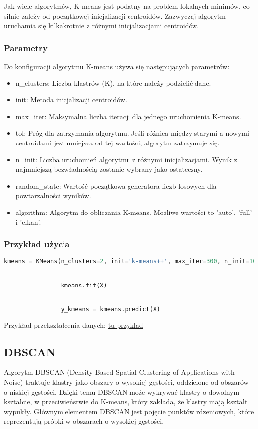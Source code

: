 			Jak wiele algorytmów, K-means jest podatny na problem lokalnych minimów, co silnie zależy od początkowej inicjalizacji centroidów. Zazwyczaj algorytm uruchamia się kilkakrotnie z różnymi inicjalizacjami centroidów.


			
		\subsubsection{Parametry}
			Do konfiguracji algorytmu K-means używa się następujących parametrów:
			\begin{itemize}
				\item n\_clusters: Liczba klastrów (K), na które należy podzielić dane.
				\item init: Metoda inicjalizacji centroidów.
				\item max\_iter: Maksymalna liczba iteracji dla jednego uruchomienia K-means.
				\item tol: Próg dla zatrzymania algorytmu. Jeśli różnica między starymi a nowymi centroidami jest mniejsza od tej wartości, algorytm zatrzymuje się.
				\item n\_init: Liczba uruchomień algorytmu z różnymi inicjalizacjami. Wynik z najmniejszą bezwładnością zostanie wybrany jako ostateczny.
				\item random\_state: Wartość początkowa generatora liczb losowych dla powtarzalności wyników.
				\item algorithm: Algorytm do obliczania K-means. Możliwe wartości to 'auto', 'full' i 'elkan'.
			\end{itemize}
			
		\subsubsection{Przykład użycia}
			\begin{lstlisting}[language=Python]
				kmeans = KMeans(n_clusters=2, init='k-means++', max_iter=300, n_init=10, random_state=0)


				kmeans.fit(X)


				y_kmeans = kmeans.predict(X)
			\end{lstlisting}
			
			
			Przykład przekształcenia danych:
			\underline{tu przyklad}

	  
	\subsection{DBSCAN}
		Algorytm DBSCAN (Density-Based Spatial Clustering of Applications with Noise) traktuje klastry jako obszary o wysokiej gęstości, oddzielone od obszarów o niskiej gęstości. Dzięki temu DBSCAN może wykrywać klastry o dowolnym kształcie, w przeciwieństwie do K-means, który zakłada, że klastry mają kształt wypukły. Głównym elementem DBSCAN jest pojęcie punktów rdzeniowych, które reprezentują próbki w obszarach o wysokiej gęstości. \cite{dbscan}


